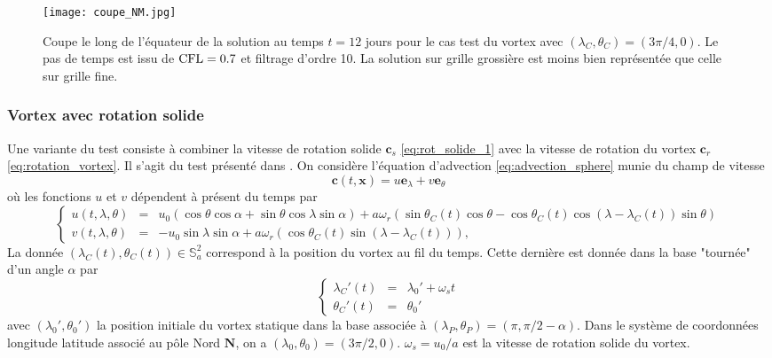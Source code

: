 \begin{figure}[htbp]
\begin{center}
\texttt{[image: coupe\_NM.jpg]}
\end{center}
\caption{Coupe le long de l'équateur de la solution au temps $t=12$ jours pour le cas test du vortex \cite{Nair2002} avec $(\lambda_C, \theta_C) = (3 \pi / 4,0)$. Le pas de temps est issu de $\text{CFL} = 0.7$ et filtrage d'ordre 10. La solution sur grille grossière est moins bien représentée que celle sur grille fine.}
\label{fig:coupe_NM}
\end{figure}









\subsubsection{Vortex avec rotation solide}

Une variante du test \cite{Nair2002} consiste à combiner la vitesse de rotation solide $\mathbf{c}_s$ \eqref{eq:rot_solide_1} avec la vitesse de rotation du vortex $\mathbf{c}_r$ \eqref{eq:rotation_vortex}. Il s'agit du test présenté dans \cite{Nair2008}.
On considère l'équation d'advection \eqref{eq:advection_sphere} munie du champ de vitesse
\begin{equation}
\mathbf{c}(t,\mathbf{x}) = u \mathbf{e}_{\lambda} + v \mathbf{e}_{\theta}
\end{equation}
où les fonctions $u$ et $v$ dépendent à présent du temps par 
\begin{equation}
\left\lbrace
\begin{array}{rcl}
u(t,\lambda, \theta) & = & u_0 \left( \cos \theta \cos \alpha + \sin \theta \cos \lambda \sin \alpha \right) + a \omega_r \left( \sin \theta_C(t) \cos \theta - \cos \theta_C(t) \cos (\lambda - \lambda_C(t)) \sin \theta \right) \\
v(t,\lambda, \theta) & = & - u_0 \sin \lambda \sin \alpha + a \omega_r \left( \cos \theta_C(t) \sin (\lambda - \lambda_C(t)) \right),
\end{array}
\right.
\label{eq:vitesse_NJ}
\end{equation}
La donnée $(\lambda_C(t), \theta_C(t)) \in \mathbb{S}_a^2$ correspond à la position du vortex au fil du temps. Cette dernière est donnée dans la base "tournée" d'un angle $\alpha$ par
\begin{equation}
\label{eq:vortexcenter1}
\left\lbrace
\begin{array}{rcl}
\lambda_C'(t) & = & \lambda_0' + \omega_s t \\
\theta_C'(t) & = & \theta_0'
\end{array}
\right.
\end{equation}
avec $(\lambda_0', \theta_0')$ la position initiale du vortex statique dans la base associée à $(\lambda_P, \theta_P)=(\pi, \pi/2-\alpha)$. Dans le système de coordonnées longitude latitude associé au pôle Nord $\mathbf{N}$, on a $(\lambda_0,\theta_0)=(3 \pi / 2, 0)$. $\omega_s = u_0/a$ est la vitesse de rotation solide du vortex. 

